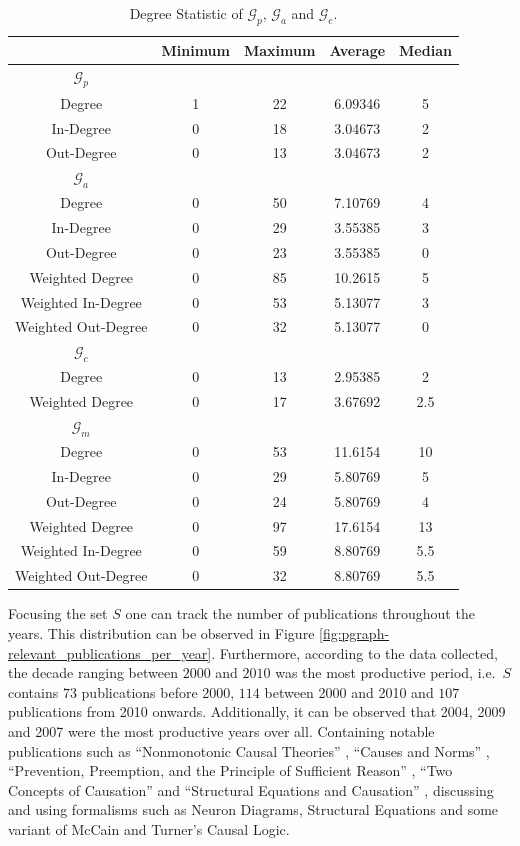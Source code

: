 \documentclass[11pt,a4paper]{book}
\theoremstyle{definition}
\theoremstyle{definition}
\theoremstyle{definition}
\theoremstyle{remark}
\newcommand{\pset}{S}
\newcommand{\pgraph}{\mathcal{G}_{p}}
\newcommand{\agraph}{\mathcal{G}_{a}}
\newcommand{\cgraph}{\mathcal{G}_{c}}
\newcommand{\acgraph}{\mathcal{G}_{m}}
\begin{document}
\begin{center}
\begin{table}
\small
\centering
\begin{tabular}{c| c c c c }
\toprule
{} &  Minimum &  Maximum &  Average &  Median \\
\midrule
\midrule
$\pgraph$ \\
\midrule
Degree & 1 & 22 & 6.09346 & 5 \\
In-Degree &  0 &   18 & 3.04673 & 2 \\
Out-Degree &  0 &   13 & 3.04673 & 2 \\
\midrule
$\agraph$ \\
\midrule
Degree & 0 & 50 & 7.10769 &  4 \\
In-Degree &  0 &   29 & 3.55385 & 3 \\
Out-Degree &  0 &   23 & 3.55385  &  0 \\
Weighted Degree & 0 & 85 & 10.2615 &  5 \\
Weighted In-Degree &  0 &   53 & 5.13077 & 3 \\
Weighted Out-Degree &  0 &    32 & 5.13077 &  0 \\
\midrule
$\cgraph$ \\
\midrule
 Degree & 0 & 13 & 2.95385& 2 \\
Weighted Degree & 0 & 17 & 3.67692 & 2.5 \\
\midrule
$\acgraph$ \\
\midrule
Degree & 0 & 53 & 11.6154 &  10 \\
In-Degree &  0 &   29 & 5.80769 & 5 \\
Out-Degree &  0 &   24 &  5.80769  &  4 \\
Weighted Degree & 0 & 97 & 17.6154 &  13 \\
Weighted In-Degree &  0 &   59 & 8.80769&  5.5 \\
Weighted Out-Degree &  0 &    32 & 8.80769 &   5.5 \\
\bottomrule
\end{tabular}
\caption{Degree Statistic of $\pgraph$, $\agraph$ and $\cgraph$.}
\label{tab:pgraph-degree_stat}
\end{table}
\end{center}


Focusing the set $\pset$ one can track the number of publications throughout the years. This distribution can be observed in Figure \ref{fig:pgraph-relevant_publications_per_year}. 
Furthermore, according to the data collected, the decade ranging between $2000$ and $2010$ was the most productive period, i.e.\ $\pset$ contains $73$ publications before 2000, $114$ between 2000 and 2010 and $107$ publications from 2010 onwards. Additionally, it can be observed that 2004, 2009 and 2007 were the most productive years over all. Containing notable publications such as 
``Nonmonotonic Causal Theories'' \parencite{giunchiglia2004nonmonotonic}, ``Causes and Norms'' \parencite{hitchcock2009cause}, ``Prevention, Preemption, and the Principle of Sufficient Reason'' \parencite{hitchcock2007prevention}, ``Two Concepts of Causation'' \parencite{hall2004two} and ``Structural Equations and Causation'' \parencite{hall2007structural}, 
discussing and using formalisms such as Neuron Diagrams, Structural Equations and some variant of McCain and Turner's Causal Logic.
\end{document}
